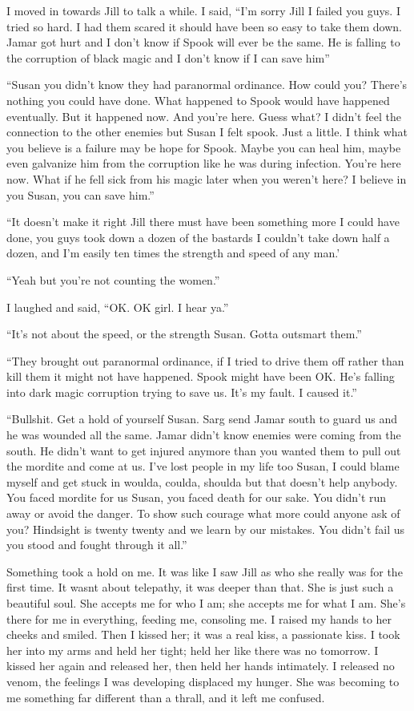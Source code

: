 I moved in towards Jill to talk a while. I said, ``I'm sorry Jill I failed you guys. I tried so hard. I had them scared it should have been so easy to take them down. Jamar got hurt and I don't know if Spook will ever be the same. He is falling to the corruption of black magic and I don't know if I can save him''

``Susan you didn't know they had paranormal ordinance. How could you? There's nothing you could have done. What happened to Spook would have happened eventually. But it happened now. And you're here. Guess what? I didn't feel the connection to the other enemies but Susan I felt spook. Just a little. I think what you believe is a failure may be hope for Spook. Maybe you can heal him, maybe even galvanize him from the corruption like he was during infection. You're here now. What if he fell sick from his magic later when you weren't here? I believe in you Susan, you can save him.''

``It doesn't make it right Jill there must have been something more I could have done, you guys took down a dozen of the bastards I couldn't take down half a dozen, and I'm easily ten times the strength and speed of any man.'

``Yeah but you're not counting the women.''

I laughed and said, ``OK. OK girl. I hear ya.''

``It's not about the speed, or the strength Susan. Gotta outsmart them.''

``They brought out paranormal ordinance, if I tried to drive them off rather than kill them it might not have happened. Spook might have been OK. He's falling into dark magic corruption trying to save us. It's my fault. I caused it.''

``Bullshit. Get a hold of yourself Susan. Sarg send Jamar south to guard us and he was wounded all the same. Jamar didn't know enemies were coming from the south. He didn't want to get injured anymore than you wanted them to pull out the mordite and come at us. I've lost people in my life too Susan, I could blame myself and get stuck in woulda, coulda, shoulda but that doesn't help anybody. You faced mordite for us Susan, you faced death for our sake. You didn't run away or avoid the danger. To show such courage what more could anyone ask of you? Hindsight is twenty twenty and we learn by our mistakes. You didn't fail us you stood and fought through it all.''

Something took a hold on me. It was like I saw Jill as who she really was for the first time. It wasnt about telepathy, it was deeper than that. She is just such a beautiful soul. She accepts me for who I am; she accepts me for what I am. She's there for me in everything, feeding me, consoling me. I raised my hands to her cheeks and smiled. Then I kissed her; it was a real kiss, a passionate kiss. I took her into my arms and held her tight; held her like there was no tomorrow. I kissed her again and released her, then held her hands intimately. I released no venom, the feelings I was developing displaced my hunger. She was becoming to me something far different than a thrall, and it left me confused.

